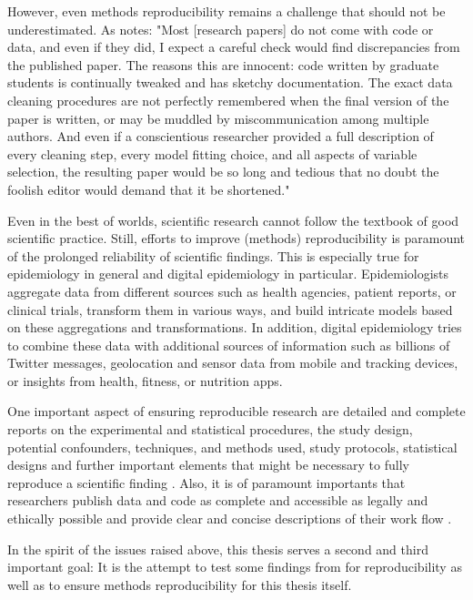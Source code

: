 \documentclass[11pt, a4paper,twoside]{report}\usepackage[]{graphicx}\usepackage[]{color}
\begin{document}
However, even methods reproducibility remains a challenge that should not be underestimated. As \cite{banks_reproducible_2011} notes: "Most [research papers] do not come with code or data, and even if they did, I expect a careful check would find discrepancies from the published paper. The reasons this are innocent: code written by graduate students is continually tweaked and has sketchy documentation. The exact data cleaning procedures are not perfectly remembered when the final version of the paper is written, or may be muddled by miscommunication among multiple authors. And even if a conscientious researcher provided a full description of every cleaning step, every model fitting choice, and all aspects of variable selection, the resulting paper would be so long and tedious that no doubt the foolish editor would demand that it be shortened."

Even in the best of worlds, scientific research cannot follow the textbook of good scientific practice. Still, efforts to improve (methods) reproducibility is paramount of the prolonged reliability of scientific findings. This is especially true for epidemiology in general and digital epidemiology in particular. Epidemiologists aggregate data from different sources such as health agencies, patient reports, or clinical trials, transform them in various ways, and build intricate models based on these aggregations and transformations. In addition, digital epidemiology tries to combine these data with additional sources of information such as billions of Twitter messages, geolocation and sensor data from mobile and tracking devices, or insights from health, fitness, or nutrition apps. 

One important aspect of ensuring reproducible research are detailed and complete reports on the experimental and statistical procedures, the study design, potential confounders, techniques, and methods used, study protocols, statistical designs and further important elements that might be necessary to fully reproduce a scientific finding \citep{kass_ten_2016}. Also, it is of paramount importants that researchers publish data and code as complete and accessible as legally and ethically possible and provide clear and concise descriptions of their work flow \citep{peng_reproducible_2006}.

In the spirit of the issues raised above, this thesis serves a second and third important goal: It is the attempt to test some findings from \cite{bodnar_data_2015} for reproducibility as well as to ensure methods reproducibility for this thesis itself.
\end{document}
